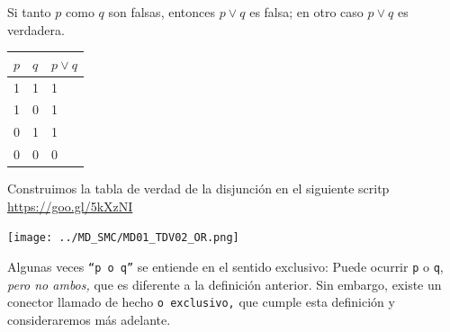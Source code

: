 \documentclass[xcolor={svgnames},
  hyperref={colorlinks}, 
  spanish, 12pt]{beamer}
\numberwithin{equation}{section} %
\numberwithin{figure}{section} %
\begin{document}
\begin{frame}
    \begin{defn}
        Si tanto $p$ como $q$ son falsas, entonces $p \vee q$ es falsa; en otro caso $p\vee q$ es verdadera.
    \end{defn}
    
\end{frame}


\begin{frame}
    \begin{tdv}[Disjunci\'on]
        \label{tdv:or}
        \begin{center}
            \begin{tabular}{|l|l|l|}\hline
                $p$ & $q$ & $p \vee q$\\\hline
                1 & 1 & 1\\\hline
                1 & 0 & 1\\\hline
                0 & 1 & 1\\\hline
                0 & 0 & 0\\\hline
            \end{tabular}
        \end{center}
        
    \end{tdv}
    
\end{frame}

\begin{frame}
    Construimos la tabla de verdad de la disjunci\'on en el siguiente scritp \href{https://cloud.sagemath.com/projects/12787063-cafe-4f3b-a2e0-905f8b83cf3b/files/MD01_TDV02_OR.sagews}{https://goo.gl/5kXzNI}
    \begin{center}
        \texttt{[image: ../MD\_SMC/MD01\_TDV02\_OR.png]}
    \end{center}
    
\end{frame}

\begin{frame}
 \begin{rem}
  Algunas veces \texttt{``p o q''} se entiende en el sentido exclusivo: Puede ocurrir \texttt{p} o \texttt{q}, \emph{pero no ambos,} que es diferente a la definici\'on anterior. Sin embargo, existe un conector llamado de hecho \texttt{o exclusivo,} que cumple esta definici\'on y consideraremos m\'as adelante. 
 \end{rem}

\end{frame}
\end{document}
